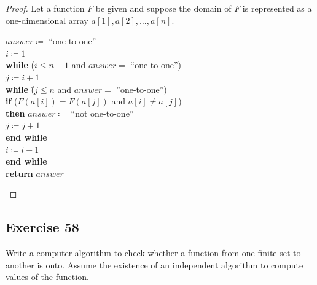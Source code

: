 \documentclass[14pt]{extarticle}
\begin{document}
\begin{proof}
Let a function $F$ be given and suppose the domain of $F$ is represented as a one-dimensional array 
\(a[1], a[2], \ldots, a[n]\). 

\begin{tabbing}
\(answer \coloneqq\) ``one-to-one'' \\
\(i \coloneqq 1\) \\
{\bf while} \= (\(i \leq n-1\) and \(answer = \) ``one-to-one'') \\
            \> \(j \coloneqq i + 1\) \\
            \> {\bf while} \= (\(j \leq n\) and \(answer =\) ''one-to-one'') \\
            \>             \> {\bf if} (\(F(a[i]) = F(a[j])\) and \(a[i] \neq a[j]\)) \\
            \>             \> {\bf then} \(answer \coloneqq \) ``not one-to-one'' \\
            \>             \> \(j \coloneqq j + 1\) \\
            \> {\bf end while} \\
\(i \coloneqq i + 1\) \\
{\bf end while} \\
{\bf return} $answer$
\end{tabbing}
\end{proof}

\subsection{Exercise 58}
Write a computer algorithm to check whether a function from one finite set to another is onto. Assume the existence of 
an independent algorithm to compute values of the function.
\end{document}
